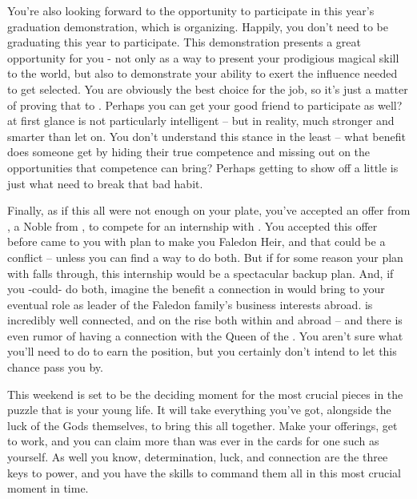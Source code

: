 \documentclass[char]{GL2020}
\begin{document}
You’re also looking forward to the opportunity to participate in this year’s graduation demonstration, which \cMusic{} is organizing.  Happily, you don’t need to be graduating this year to participate. This demonstration presents a great opportunity for you - not only as a way to present your prodigious magical skill to the world, but also to demonstrate your ability to exert the influence needed to get selected. You are obviously the best choice for the job, so it’s just a matter of proving that to \cMusic{}. Perhaps you can get your good friend \cChupStudent{} to participate as well? \cChupStudent{} at first glance is not particularly intelligent -- but in reality,  \cChupStudent{\they} \cChupStudent{\are} much stronger and smarter than \cChupStudent{\they} let\cChupStudent{\plural} on. You don’t  understand this stance in the least -- what benefit does someone get by hiding their true competence and missing out on the opportunities that competence can bring? Perhaps getting \cChupStudent{\them} to show off a little is just what \cChupStudent{\they} need\cChupStudent{\plural} to break that bad habit.

Finally, as if this all were not enough on your plate, you’ve accepted an offer from \cEvil{}, a Noble from \pFarm{}, to compete for an internship with \cEvil{\them}. You accepted this offer before \cHeir{} came to you with \cHeir{\their} plan to make you Faledon Heir, and that could be a conflict -- unless you can find a way to do both. But if for some reason your plan with \cHeir{} falls through, this internship would be a spectacular backup plan. And, if you -could- do both, imagine the benefit a connection in \pFarm{} would bring to your eventual role as leader of the Faledon family’s business interests abroad. \cEvil{} is incredibly well connected, and on the rise both within \pFarm{} and abroad -- and there is even rumor of \cEvil{} having a connection with the Queen of the \pFarm{}. You aren’t sure what you’ll need to do to earn the position, but you certainly don’t intend to let this chance pass you by.

This weekend is set to be the deciding moment for the most crucial pieces in the puzzle that is your young life. It will take everything you’ve got, alongside the luck of the Gods themselves, to bring this all together. Make your offerings, get to work, and you can claim more than was ever in the cards for one such as yourself. As well you know, determination, luck, and connection are the three keys to power, and you have the skills to command them all in this most crucial moment in time.
\end{document}

